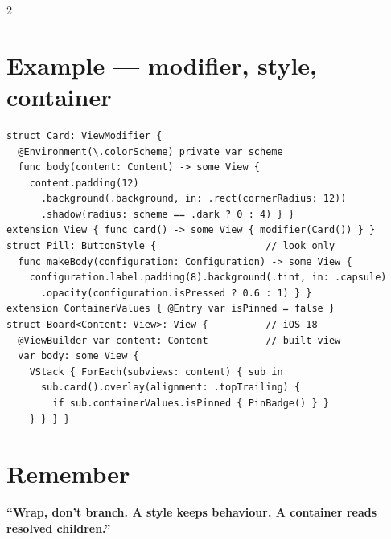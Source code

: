\documentclass[8pt]{extarticle}
\begin{document}
\begin{multicols}{2}

\section{Example — modifier, style, container}
\begin{lstlisting}[language=SwiftSheet]
struct Card: ViewModifier {
  @Environment(\.colorScheme) private var scheme
  func body(content: Content) -> some View {
    content.padding(12)
      .background(.background, in: .rect(cornerRadius: 12))
      .shadow(radius: scheme == .dark ? 0 : 4) } }
extension View { func card() -> some View { modifier(Card()) } }
struct Pill: ButtonStyle {                   // look only
  func makeBody(configuration: Configuration) -> some View {
    configuration.label.padding(8).background(.tint, in: .capsule)
      .opacity(configuration.isPressed ? 0.6 : 1) } }
extension ContainerValues { @Entry var isPinned = false }
struct Board<Content: View>: View {          // iOS 18
  @ViewBuilder var content: Content          // built view
  var body: some View {
    VStack { ForEach(subviews: content) { sub in
      sub.card().overlay(alignment: .topTrailing) {
        if sub.containerValues.isPinned { PinBadge() } }
    } } } }
\end{lstlisting}

\section{Remember}
\textbf{``Wrap, don't branch. A style keeps behaviour. A container reads resolved children.''}


\end{multicols}

\end{document}
